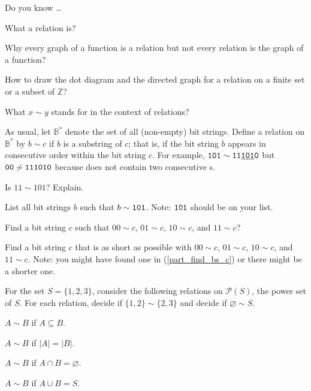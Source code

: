\begin{exer}[\exerR] %
\label{exer_dyk_relations}
    Do you know \ldots
        \begin{exerpart}
            \item What a relation is?
            \item Why every graph of a function is a relation but not every relation is the graph of a function?
            \item How to draw the dot diagram and the directed graph for a relation on a finite set or a subset of $\mathbb{Z}$?
            \item What $x \sim y$ stands for in the context of relations?
        \end{exerpart}
\end{exer} 

\begin{exer} [\exerE] %
\label{exer_relation_bs} 
    As usual, let $\mathbb{B}^*$ denote the set of all (non-empty) bit strings.  Define a relation on $\mathbb{B}^*$ by $b \sim c$ if $b$ is a substring of $c$; that is, if  the bit string $b$ appears in consecutive order within the bit string $c$.  For example, $\texttt{101} \sim \texttt{11}\underline{\texttt{101}}\texttt{0}$ but $\texttt{00} \not\sim \texttt{111010}$ because  does not contain two consecutive s.
        \begin{exerpart}
            \item Is $11 \sim 101$?  Explain.
            \item List all bit strings $b$ such that $b \sim \texttt{101}$. Note: $\texttt{101}$ should be on your list.
            \item \label{part_find_bs_c} Find a bit string $c$ such that $00 \sim c$, $01 \sim c$, $10 \sim c$, and $11 \sim c$?  
            \item Find a bit string $c$ that is as short as possible with $00 \sim c$, $01 \sim c$, $10 \sim c$, and $11 \sim c$. Note: you might have found one in (\ref{part_find_bs_c}) or there might be a shorter one.
        \end{exerpart}
\end{exer}

\begin{exer}[\exerE] %
\label{exer_relations_on_power_set}
    For the set $S = \{1, 2, 3\}$, consider the following relations on $\mathscr{P}(S)$, the power set of $S$.  For each relation, decide if $\{1,2\} \sim \{2,3\}$ and decide if $\varnothing \sim S$.
        \begin{exerpart}
            \item $A \sim B$ if $A \subseteq B$.
            \item $A \sim B$ if $|A|=|B|$.
            \item $A \sim B$ if $A \cap B = \varnothing$.
            \item $A \sim B$ if $A \cup B = S$.
        \end{exerpart}
\end{exer}

